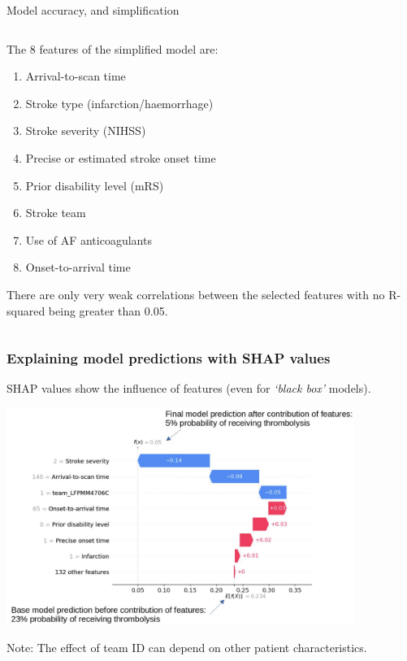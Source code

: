 \documentclass[xcolor={usenames,dvipsnames}]{beamer}
\begin{document}
\begin{frame}{Model accuracy, and simplification}
\begin{columns}[T]
    \begin{column}{0.5\textwidth}
    The 8 features of the simplified model are:
        \begin{footnotesize}
        \begin{enumerate}
            \item Arrival-to-scan time
            \item Stroke type (infarction/haemorrhage)
            \item Stroke severity (NIHSS)
            \item Precise or estimated stroke onset time
            \item Prior disability level (mRS)
            \item Stroke team
            \item Use of AF anticoagulants
            \item Onset-to-arrival time
        \end{enumerate}
        \end{footnotesize}
        
    \vspace{2mm}
    \tiny{There are only very weak correlations between the selected features with no R-squared being greater than 0.05.}
    \end{column}
    
\end{columns}
\end{frame}



\begin{frame}
\frametitle{Explaining model predictions with SHAP values}

SHAP values show the influence of features (even for \emph{`black box'} models).

\begin{center}
\includegraphics[width=0.85\textwidth]{./images/xgb_waterfall_low_probability.jpg}
\end{center}
\footnotesize
Note: The effect of team ID can depend on other patient characteristics.
\end{frame}
\end{document}
